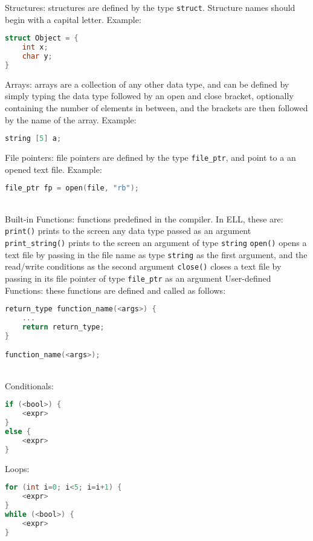 \documentclass{article}
\begin{document}
Structures: structures are defined by the type {\ttfamily\texttt{struct}}. Structure names should begin with a capital letter. Example:
\begin{lstlisting}[language=C]
struct Object = {
    int x;
    char y;
}
\end{lstlisting}
Arrays: arrays are a collection of any other data type, and can be defined by simply typing the data type followed by an open and close bracket, optionally containing the number of elements in between, and the brackets are then followed by the name of the array. Example:
\begin{lstlisting}[language=C]
string [5] a;
\end{lstlisting}
File pointers: file pointers are defined by the type {\ttfamily\texttt{file\_ptr}}, and point to a an opened text file. Example:
\begin{lstlisting}[language=C]
file_ptr fp = open(file, "rb");
\end{lstlisting}
\ \\
 \newline
Built-in Functions: functions predefined in the compiler. In ELL, these are: \newline
{\ttfamily\texttt{print()}} prints to the screen any data type passed as an argument \newline
{\ttfamily\texttt{print\_string()}} prints to the screen an argument of type {\ttfamily\texttt{string}} \newline
{\ttfamily\texttt{open()}} opens a text file by passing in the file name as type {\ttfamily\texttt{string}} as the first argument, and the read/write conditions as the second argument \newline
{\ttfamily\texttt{close()}} closes a text file by passing in its file pointer of type {\ttfamily\texttt{file\_ptr}} as an argument \newline \newline
User-defined Functions: these functions are defined and called as follows:
\begin{lstlisting}[language=C]
return_type function_name(<args>) {
    ...
    return return_type;
}

function_name(<args>);
\end{lstlisting} \ \\
 \newline
Conditionals:
\begin{lstlisting}[language=C]
if (<bool>) {
    <expr>
}
else {
    <expr>
}
\end{lstlisting}
Loops:
\begin{lstlisting}[language=C]
for (int i=0; i<5; i=i+1) {
    <expr>
}
while (<bool>) {
    <expr>
}

\end{lstlisting}
\end{document}
